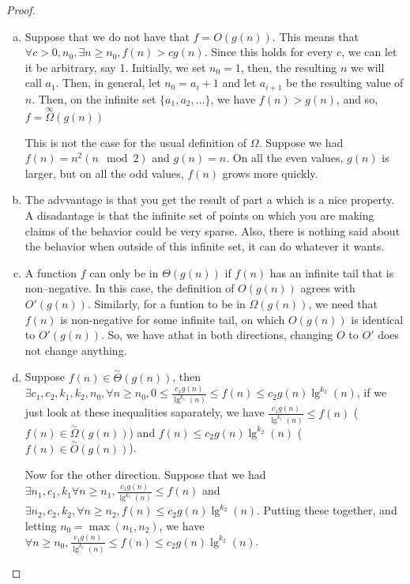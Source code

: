 \documentclass{article}
\begin{document}
\begin{proof}
\begin{enumerate}[a)]
\item
Suppose that we do not have that $f=O(g(n))$. This means that $\forall c>0,n_0, \exists n\ge n_0, f(n) > c g(n)$. Since this holds for every $c$, we can let it be arbitrary, say 1. Initially, we set $n_0=1$, then, the resulting $n$ we will call $a_1$. Then, in general, let $n_0= a_i+1$ and let $a_{i+1}$ be the resulting value of $n$. Then, on the infinite set $\{a_1,a_2,\ldots\}$, we have $f(n)>g(n)$, and so, $f = \overset{\infty}{\Omega}(g(n))$

This is not the case for the usual definition of $\Omega$. Suppose we had $f(n) = n^2(n\mod 2)$ and $g(n) = n$. On all the even values, $g(n)$ is larger, but on all the odd values, $f(n)$ grows more quickly.

\item
The advvantage is that you get the result of part a which is a nice property. A disadantage is that the infinite set of points on which you are making claims of the behavior could  be very sparse. Also, there is nothing said about the behavior when outside of this infinite set, it can do whatever it wants.

\item
A function $f$ can only be in $\Theta(g(n))$ if $f(n)$ has an infinite tail that is non--negative. In this case, the definition of $O(g(n))$ agrees with $O'(g(n))$. Similarly, for a funtion to be in $\Omega(g(n))$, we need that $f(n)$ is non-negative for some infinite tail, on which $O(g(n))$ is identical to $O'(g(n))$. So, we have athat in both directions, changing $O$ to $O'$ does not change anything.

\item
Suppose $f(n)\in \overset{\sim}{\Theta}(g(n))$, then $\exists c_1,c_2,k_1,k_2,n_0, \forall n\ge n_0, 0\le \frac{c_1 g(n)}{\lg^{k_1}(n)} \le f(n) \le c_2 g(n)\lg^{k_2}(n)$, if we just look at these inequalities saparately, we have $\frac{c_1 g(n)}{\lg^{k_1}(n)} \le f(n)$ ($f(n) \in \overset{\sim}{\Omega}(g(n))$) and $f(n) \le c_2 g(n)\lg^{k_2}(n)$ ($f(n)\in \overset{\sim}{O}(g(n))$).

Now for the other direction. Suppose that we had $\exists n_1, c_1,k_1 \forall n\ge n_1, \frac{c_1 g(n)}{\lg^{k_1}(n)} \le f(n)$ and $\exists n_2,c_2,k_2, \forall n\ge n_2, f(n)\le c_2g(n)\lg^{k_2}(n)$. Putting these together, and letting $n_0 = \max(n_1,n_2)$, we have $\forall n\ge n_0, \frac{c_1 g(n)}{\lg^{k_1}(n)} \le f(n) \le c_2 g(n)\lg^{k_2}(n)$. 


\end{enumerate}
\end{proof}
\end{document}
